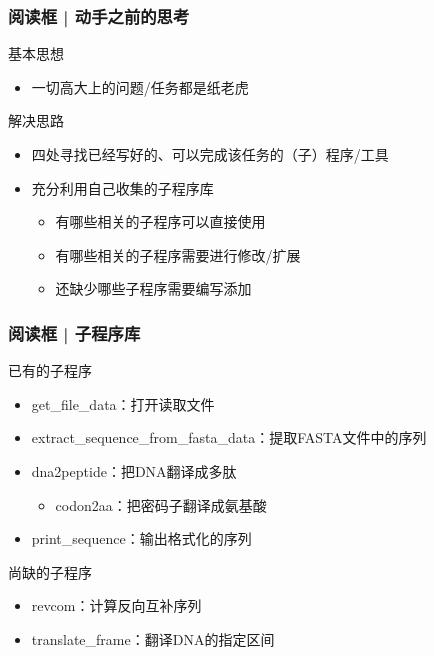 \begin{frame}
  \frametitle{阅读框 | 动手之前的思考}
  \begin{block}{基本思想}
    \begin{itemize}
      \item 一切高大上的问题/任务都是纸老虎
    \end{itemize}
  \end{block}
  \pause
  \begin{block}{解决思路}
    \begin{itemize}
      \item 四处寻找已经写好的、可以完成该任务的（子）程序/工具
      \item 充分利用自己收集的子程序库
	\begin{itemize}
	  \item 有哪些相关的子程序可以直接使用
	  \item 有哪些相关的子程序需要进行修改/扩展
	  \item 还缺少哪些子程序需要编写添加
	\end{itemize}
    \end{itemize}
  \end{block}
\end{frame}

\begin{frame}
  \frametitle{阅读框 | 子程序库}
  \begin{block}{已有的子程序}
    \begin{itemize}
      \item get\_file\_data：打开读取文件
      \item extract\_sequence\_from\_fasta\_data：提取FASTA文件中的序列
      \item dna2peptide：把DNA翻译成多肽
	\begin{itemize}
	  \item codon2aa：把密码子翻译成氨基酸
	\end{itemize}
      \item print\_sequence：输出格式化的序列
    \end{itemize}
  \end{block}
  \pause
  \begin{block}{尚缺的子程序}
    \begin{itemize}
      \item revcom：计算反向互补序列
      \item translate\_frame：翻译DNA的指定区间
    \end{itemize}
  \end{block}
\end{frame}

